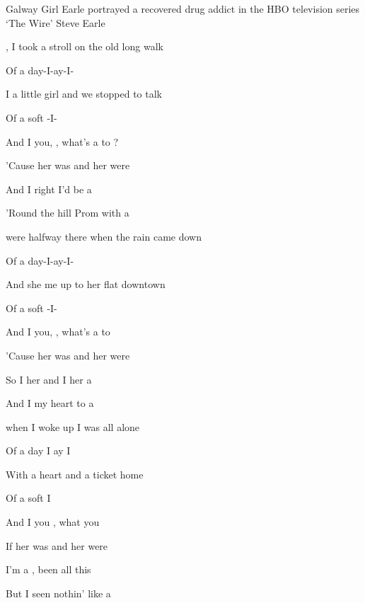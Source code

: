 \begin{SBSong}{Galway Girl}
  {Earle portrayed a recovered drug addict in the HBO television series `The Wire'}
  {Steve Earle}
  \begin{SBVerse}
    , I took a stroll on the old long walk 
    
    Of a day-I-ay-I-
    
    I  a little girl and we stopped to talk 
    
    Of a  soft -I- 
    
    And I  you, , what's a  to ? 
    
    'Cause her  was  and her  were  
    
    And I  right  I'd be  a  
    
    'Round the hill Prom with a  
  \end{SBVerse}
  \begin{SBVerse}
     were halfway there when the rain came down 
    
    Of a day-I-ay-I-
    
    And she  me up to her flat downtown
    
    Of a  soft -I-
    
    And I  you, , what's a  to 
    
    'Cause her  was  and her  were  
    
    So I  her  and I  her a  
    
    And I  my heart to a   
  \end{SBVerse}
  \begin{SBVerse}
     when I woke up I was all alone 
    
    Of a day I ay I 
    
    With a  heart and a ticket home
    
     Of a  soft  I 
    
    And I  you , what  you  
    
    If her  was  and her  were  
    
    I'm a  , been all  this  
    
    But I  seen nothin' like a   
  \end{SBVerse}
\end{SBSong}

